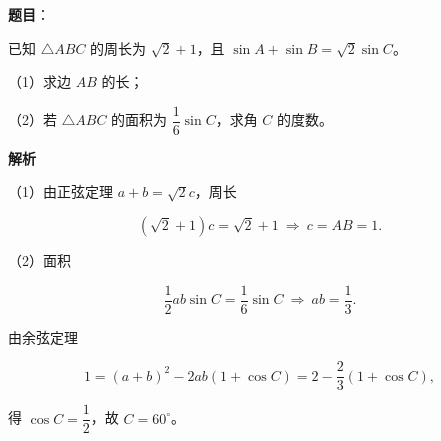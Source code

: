 \begin{answer}

\textbf{题目}：

已知 $\triangle ABC$ 的周长为 $\sqrt2+1$，且 $\sin A+\sin B=\sqrt2\sin C$。

（1）求边 $AB$ 的长；

（2）若 $\triangle ABC$ 的面积为 $\dfrac16\sin C$，求角 $C$ 的度数。

\textbf{解析}

（1）由正弦定理 $a+b=\sqrt2c$，周长

\nopagebreak[4]
\[(\sqrt2+1)c=\sqrt2+1\ \Rightarrow\ c=AB=1.\]

（2）面积

\nopagebreak[4]
\[\frac12ab\sin C=\frac16\sin C\ \Rightarrow\ ab=\frac13.\]

由余弦定理

\nopagebreak[4]
\[1=(a+b)^2-2ab(1+\cos C)=2-\frac23(1+\cos C),\]

得 $\cos C=\dfrac12$，故 $C=60^\circ$。


\end{answer}
